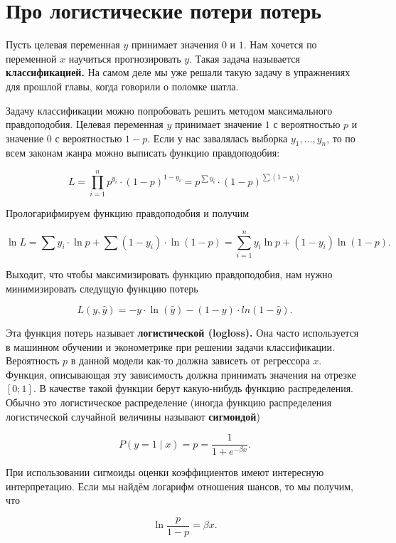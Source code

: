 \documentclass[12pt, a4paper, oneside]{extreport}
\def \b{\beta}
\newcommand{\dx}[1]{\,\mathrm{d}#1} %
\newcommand{\indef}[1]{\textbf{#1}}     %
\theoremstyle{plain}              %
\theoremstyle{definition}         %
\begin{document}



\section{Про логистические потери потерь}

Пусть целевая переменная $y$ принимает значения $0$ и $1$.  Нам хочется по переменной $x$ научиться прогнозировать $y$. Такая задача называется \indef{классификацией.}  На самом деле мы уже решали такую задачу в упражнениях для прошлой главы, когда говорили о поломке шатла. 

Задачу классификации можно попробовать решить методом максимального правдоподобия. Целевая переменная $y$ принимает значение $1$ с вероятностью $p$ и значение $0$ с вероятностью $1-p$.  Если у нас завалялась выборка $y_1, \ldots, y_n$, то по всем законам жанра можно выписать функцию правдоподобия: 

\[ L = \prod_{i=1}^n {p^{y_i} \cdot (1-p)^{1-y_i} }= p^{\sum y_i} \cdot (1 - p)^{\sum (1 - y_i)}\]

Прологарифмируем функцию правдоподобия и получим

\[ \ln L = \sum y_i \cdot \ln p + \sum(1 - y_i) \cdot \ln (1-p) = \sum_{i=1}^n y_i \ln p + (1- y_i) \ln (1-p).\]
 
Выходит, что чтобы максимизировать функцию правдоподобия, нам нужно минимизировать следущую функцию потерь

\[L(y, \hat y) = -y \cdot \ln (\hat  y) - (1-y) \cdot ln(1 - \hat y). \] 

Эта функция потерь называет \indef{логистической (logloss).} Она часто используется в машинном обучении и эконометрике при решении задачи классификации.  Вероятность $p$ в данной модели как-то должна зависеть от регрессора $x$.  Функция, описывающая эту зависимость должна принимать значения на отрезке $[0;1]$. В качестве такой функции берут какую-нибудь функцию распределения.  Обычно это логистическое распределение (иногда функцию распределения логистической случайной величины называют \indef{сигмоидой})

\[ P(y = 1 \mid x) = p =  \frac{1}{1 + e^{-\b x}}.\]

При использовании сигмоиды оценки коэффициентов имеют интересную интерпретацию. Если мы найдём логарифм отношения шансов, то мы получим, что 

\[ \ln \frac{p}{1-p} = \b x. \]
\end{document}
